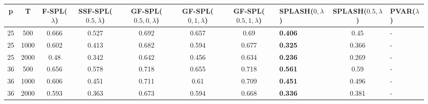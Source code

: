 \begin{tabular}{ccccccclcl}
\hline
  p  &  T   &  F-SPL($\lambda$)  &  SSF-SPL($0.5, \lambda$)  &  GF-SPL($0.5, 0, \lambda$)  &  GF-SPL($0, 1, \lambda$)  &  GF-SPL($0.5, 1, \lambda$)  & SPLASH($0, \lambda$)   &  SPLASH($0.5, \lambda$)  & PVAR($\lambda$)   \\
\hline
 25  & 500  &       0.666        &           0.527           &            0.692            &           0.657           &            0.69             & \textbf{0.406}         &           0.45           & -                 \\
 25  & 1000 &       0.602        &           0.413           &            0.682            &           0.594           &            0.677            & \textbf{0.325}         &          0.366           & -                 \\
 25  & 2000 &        0.48        &           0.342           &            0.642            &           0.456           &            0.634            & \textbf{0.236}         &          0.269           & -                 \\
 36  & 500  &       0.656        &           0.578           &            0.718            &           0.655           &            0.718            & \textbf{0.561}         &           0.59           & -                 \\
 36  & 1000 &       0.606        &           0.451           &            0.711            &           0.61            &            0.709            & \textbf{0.451}         &          0.496           & -                 \\
 36  & 2000 &       0.593        &           0.363           &            0.673            &           0.594           &            0.668            & \textbf{0.336}         &          0.381           & -                 \\
\hline
\end{tabular}